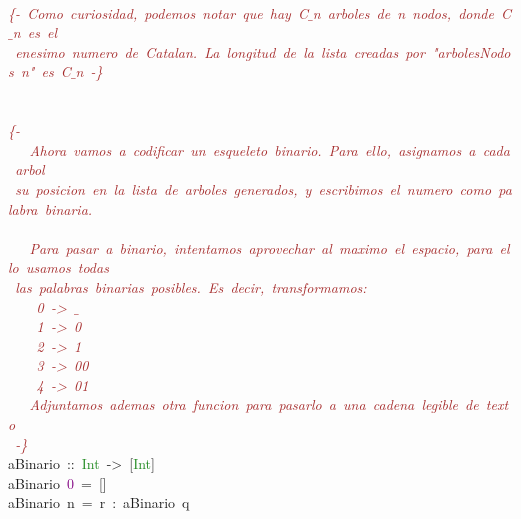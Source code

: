 \begin{allintypewriter}
\mbox{} \\
\mbox{}\textit{\textcolor{Brown}{\{-\ Como\ curiosidad,\ podemos\ notar\ que\ hay\ C$\_$n\ arboles\ de\ n\ nodos,\ donde\ C$\_$n\ es\ el\ }} \\
\mbox{}\textit{\textcolor{Brown}{\ enesimo\ numero\ de\ Catalan.\ La\ longitud\ de\ la\ lista\ creadas\ por\ "{}arbolesNodos\ n"{}\ es\ C$\_$n\ -\}}} \\
\mbox{} \\
\mbox{} \\
\mbox{}\textit{\textcolor{Brown}{\{-\ }} \\
\mbox{}\textit{\textcolor{Brown}{\ \ \ Ahora\ vamos\ a\ codificar\ un\ esqueleto\ binario.\ Para\ ello,\ asignamos\ a\ cada\ arbol}} \\
\mbox{}\textit{\textcolor{Brown}{\ su\ posicion\ en\ la\ lista\ de\ arboles\ generados,\ y\ escribimos\ el\ numero\ como\ palabra\ binaria.}} \\
\mbox{} \\
\mbox{}\textit{\textcolor{Brown}{\ \ \ Para\ pasar\ a\ binario,\ intentamos\ aprovechar\ al\ maximo\ el\ espacio,\ para\ ello\ usamos\ todas}} \\
\mbox{}\textit{\textcolor{Brown}{\ las\ palabras\ binarias\ posibles.\ Es\ decir,\ transformamos:}} \\
\mbox{}\textit{\textcolor{Brown}{\ \ \ \ 0\ -\textgreater{}\ $\_$}} \\
\mbox{}\textit{\textcolor{Brown}{\ \ \ \ 1\ -\textgreater{}\ 0}} \\
\mbox{}\textit{\textcolor{Brown}{\ \ \ \ 2\ -\textgreater{}\ 1}} \\
\mbox{}\textit{\textcolor{Brown}{\ \ \ \ 3\ -\textgreater{}\ 00}} \\
\mbox{}\textit{\textcolor{Brown}{\ \ \ \ 4\ -\textgreater{}\ 01}} \\
\mbox{}\textit{\textcolor{Brown}{\ \ \ Adjuntamos\ ademas\ otra\ funcion\ para\ pasarlo\ a\ una\ cadena\ legible\ de\ texto}} \\
\mbox{}\textit{\textcolor{Brown}{\ -\}}} \\
\mbox{}aBinario\ \textcolor{BrickRed}{::}\ \textcolor{ForestGreen}{Int}\ \textcolor{BrickRed}{-\textgreater{}}\ \textcolor{BrickRed}{[}\textcolor{ForestGreen}{Int}\textcolor{BrickRed}{]} \\
\mbox{}aBinario\ \textcolor{Purple}{0}\ \textcolor{BrickRed}{=}\ \textcolor{BrickRed}{[]} \\
\mbox{}aBinario\ n\ \textcolor{BrickRed}{=}\ r\ \textcolor{BrickRed}{:}\ aBinario\ q \\

\end{allintypewriter}
